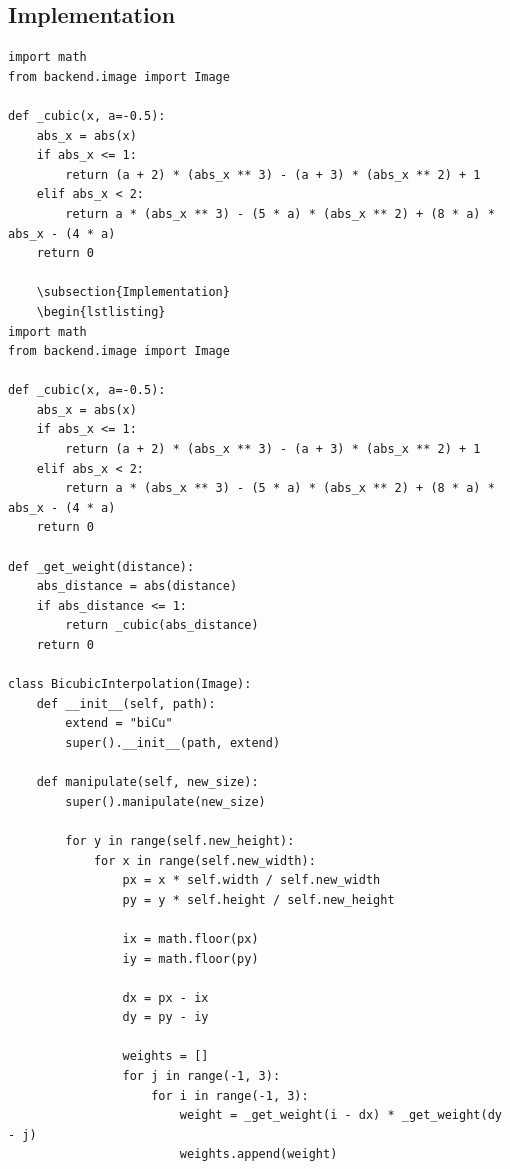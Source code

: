     \subsection{Implementation}\label{sec:bicubic-implementation}
    \begin{lstlisting}[caption={Python-Klasse zur Bikubischen interpolation \url{https://github.com/studienarbeit-cnn-dhbwka-2022/Code/blob/main/backend/skalierungsmethoden/bicubic_interpolation.py}.}]
import math
from backend.image import Image

def _cubic(x, a=-0.5):
    abs_x = abs(x)
    if abs_x <= 1:
        return (a + 2) * (abs_x ** 3) - (a + 3) * (abs_x ** 2) + 1
    elif abs_x < 2:
        return a * (abs_x ** 3) - (5 * a) * (abs_x ** 2) + (8 * a) *
abs_x - (4 * a)
    return 0

    \subsection{Implementation}
    \begin{lstlisting}
import math
from backend.image import Image

def _cubic(x, a=-0.5):
    abs_x = abs(x)
    if abs_x <= 1:
        return (a + 2) * (abs_x ** 3) - (a + 3) * (abs_x ** 2) + 1
    elif abs_x < 2:
        return a * (abs_x ** 3) - (5 * a) * (abs_x ** 2) + (8 * a) *
abs_x - (4 * a)
    return 0

def _get_weight(distance):
    abs_distance = abs(distance)
    if abs_distance <= 1:
        return _cubic(abs_distance)
    return 0

class BicubicInterpolation(Image):
    def __init__(self, path):
        extend = "biCu"
        super().__init__(path, extend)

    def manipulate(self, new_size):
        super().manipulate(new_size)

        for y in range(self.new_height):
            for x in range(self.new_width):
                px = x * self.width / self.new_width
                py = y * self.height / self.new_height

                ix = math.floor(px)
                iy = math.floor(py)

                dx = px - ix
                dy = py - iy

                weights = []
                for j in range(-1, 3):
                    for i in range(-1, 3):
                        weight = _get_weight(i - dx) * _get_weight(dy - j)
                        weights.append(weight)


\end{lstlisting}
